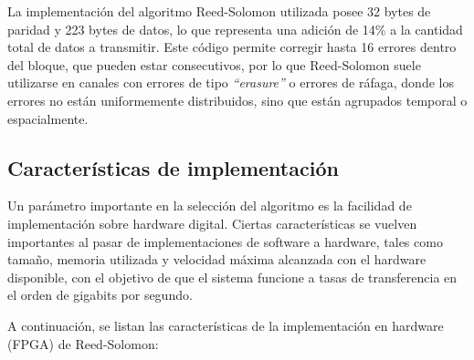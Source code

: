 La implementación del algoritmo Reed-Solomon utilizada posee 32 bytes de paridad y 223 bytes de datos, lo que representa una adición de 14\% a la cantidad total de datos a transmitir. Este código permite corregir hasta 16 errores dentro del bloque, que pueden estar consecutivos, por lo que Reed-Solomon suele utilizarse en canales con errores de tipo \textit{``erasure''} o errores de ráfaga, donde los errores no están uniformemente distribuidos, sino que están agrupados temporal o espacialmente.


\subsection{Características de implementación}
Un parámetro importante en la selección del algoritmo es la facilidad de implementación sobre hardware digital. Ciertas características se vuelven importantes al pasar de implementaciones de software a hardware, tales como tamaño, memoria utilizada y velocidad máxima alcanzada con el hardware disponible, con el objetivo de que el sistema funcione a tasas de transferencia en el orden de gigabits por segundo.

A continuación, se listan las características de la implementación en hardware (FPGA) de Reed-Solomon:


